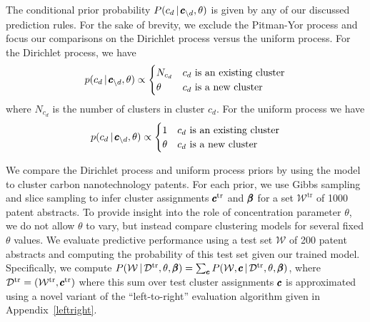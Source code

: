 \documentclass[]{article}
\begin{document}
The conditional prior probability $P(c_d \,|\, \pmb{c}_{\setminus d},
\theta)$ is given by any of our discussed prediction rules.  For the sake of brevity, we exclude the Pitman-Yor process and focus our comparisons on the Dirichlet process versus the uniform process.  For the Dirichlet process, we have
\begin{equation}
p(c_d \,|\, \pmb{c}_{\setminus d}, \theta)  \propto \begin{cases}
          N_{c_d} & c_d \textrm{ is an
    existing
    cluster}\\
          \theta  & c_d \textrm{ is a new cluster} \end{cases}
\end{equation}
where $N_{c_d}$ is the number of clusters in cluster $c_d$.  For the uniform process we have
\begin{equation}
p(c_d \,|\, \pmb{c}_{\setminus d}, \theta)  \propto \begin{cases}
          1 & c_d \textrm{ is an
    existing
    cluster}\\
          \theta  & c_d \textrm{ is a new cluster} \end{cases}
\end{equation}

We compare the Dirichlet process and uniform process priors by using
the model to cluster carbon nanotechnology patents.   For each prior, we
use Gibbs sampling and slice sampling to infer cluster assignments
$\pmb{c}^{\textrm{tr}}$ and $\pmb{\beta}$ for a set $\mathcal{W}^{\textrm{tr}}$ of 1000 patent
abstracts. To provide insight into the role of concentration parameter $\theta$, we do not allow 
$\theta$ to vary, but instead compare clustering models for several fixed $\theta$ values. We
evaluate predictive performance using a test set $\mathcal{W}$ of 200
patent abstracts and computing the probability of this test set given our trained model.  Specifically, we compute $P(\mathcal{W} \,|\, \mathcal{D}^{\textrm{tr}}, \theta, \pmb{\beta}) = \sum_{\pmb{c}} P(\mathcal{W}, \pmb{c} \,|\,
\mathcal{D}^{\textrm{tr}}, \theta, \pmb{\beta})$, where
$\mathcal{D}^{\textrm{tr}} = (\mathcal{W}^{\textrm{tr}}, \pmb{c}^{\textrm{tr}})$ where this sum over test cluster
assignments $\pmb{c}$ is approximated using a novel variant of the ``left-to-right''
evaluation algorithm given in Appendix~\ref{leftright}.  
\end{document}
